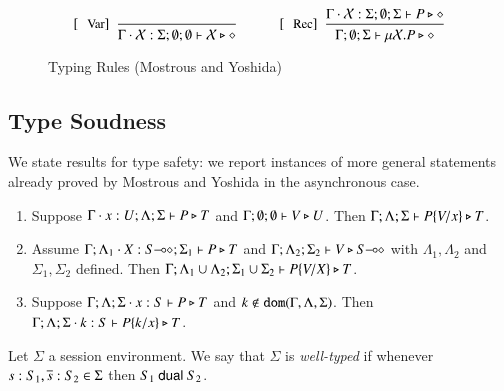\begin{figure}[!t]
\[\begin{array}{c}
		\trule{Var}~~\tree{
	
		}{
			\Gamma \cat \rvar{X}: \Sigma; \emptyset; \emptyset  \proves \rvar{X} \hastype \Proc
		}
		\qquad\quad 

	 	\trule{Rec}~~\tree{
			\Gamma \cat \rvar{X}: \Sigma; \emptyset; \Sigma  \proves P \hastype \Proc
		}{
			\Gamma ; \emptyset; \Sigma  \proves \recp{X}{P} \hastype \Proc
		}


	\end{array}
\]
\caption{Typing Rules (Mostrous and Yoshida)\label{fig:typerulesmy}}
\end{figure}

\subsection{Type Soudness}
We state results for type safety:
we report instances of more general statements already proved by Mostrous and Yoshida in the asynchronous case.

\begin{lemma}
	\begin{enumerate}[1.]
		\item	Suppose $\Gamma \cdot x:U; \Lambda; \Sigma  \vdash P \triangleright T$ and
			$\Gamma; \emptyset ; \emptyset  \vdash V \triangleright U$.
			Then $\Gamma; \Lambda; \Sigma  \vdash P\{V/x \} \triangleright T$.
	 
		\item	Assume $\Gamma; \Lambda_1 \cdot X:S\!\! \multimap\!\! \diamond; \Sigma_1  \vdash P \triangleright T$ 
			and $\Gamma; \Lambda_2; \Sigma_2  \vdash V \triangleright S\!\! \multimap\!\! \diamond$ with 
			$\Lambda_1, \Lambda_2$ and $\Sigma_1, \Sigma_2$ defined.  
			Then $\Gamma; \Lambda_1 \cup \Lambda_2; \Sigma_1 \cup \Sigma_2  \vdash P\{V/X \} \triangleright T$.

		\item	Suppose $\Gamma; \Lambda; \Sigma \cdot x:S  \vdash P \triangleright T$ and
			$k \not\in \mathtt{dom}(\Gamma, \Lambda, \Sigma)$. 
			Then $\Gamma; \Lambda; \Sigma \cdot k:S  \vdash P\{k/x \} \triangleright T$.
	\end{enumerate}
\end{lemma}

\begin{definition}
	Let $\Sigma$ a session environment.
	We say that $\Sigma$ is {\em well-typed} if whenever
	$s: S_1, \overline{s}: S_2 \in \Sigma$ then $S_1 \ \mathsf{dual}\  S_2$.
\end{definition}

